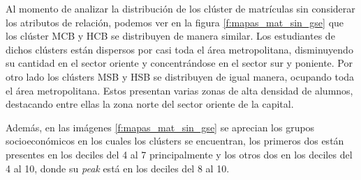 Al momento de analizar la distribución de los clúster de matrículas sin considerar los atributos de relación, podemos ver en la figura \ref{f:mapas_mat_sin_gse} que los clúster MCB y HCB se distribuyen de manera similar. Los estudiantes de dichos clústers están dispersos por casi toda el área metropolitana, disminuyendo su cantidad en el sector oriente y concentrándose en el sector sur y poniente. Por otro lado los clústers MSB y HSB se distribuyen de igual manera, ocupando toda el área metropolitana. Estos presentan varias zonas de alta densidad de alumnos, destacando entre ellas la zona norte del sector oriente de la capital.

Además, en las imágenes \ref{f:mapas_mat_sin_gse} se aprecian los grupos socioeconómicos en los cuales los clústers se encuentran, los primeros dos están presentes en los deciles del 4 al 7 principalmente y los otros dos en los deciles del 4 al 10, donde su \textit{peak} está en los deciles del 8 al 10.


